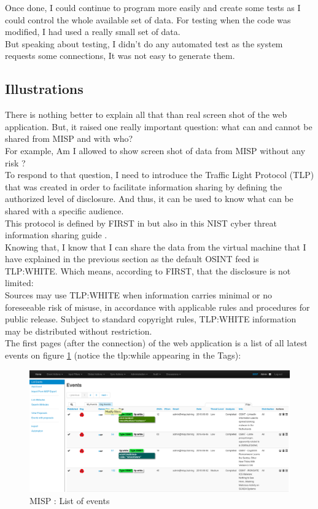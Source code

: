 \documentclass{eplmastersthesis}
\begin{document}
Once done, I could continue to program more easily and create some tests as I could control the whole available set of data. For testing when the code was modified, I had used a really small set of data. \\
But speaking about testing, I didn't do any automated test as the system requests some connections, It was not easy to generate them. 

\subsection{Illustrations}
There is nothing better to explain all that than real screen shot of the web application. But, it raised one really important question: what can and cannot be shared from MISP and with who?\\
For example, Am I allowed to show screen shot of data from MISP without any risk ?\\
To respond to that question, I need to introduce the Traffic Light Protocol (TLP) that was created in order to facilitate information sharing by defining the authorized level of disclosure. And thus, it can be used to know what can be shared with a specific audience.\\
This protocol is defined by FIRST in \cite{FirstTLP} but also in this NIST cyber threat information sharing guide \cite{johnson2016guide}.\\

Knowing that, I know that I can share the data from the virtual machine that I have explained in the previous section as the default OSINT feed is TLP:WHITE. Which means, according to FIRST, that the disclosure is not limited: \\
Sources may use TLP:WHITE when information carries minimal or no foreseeable risk of misuse, in accordance with applicable rules and procedures for public release. Subject to standard copyright rules, TLP:WHITE information may be distributed without restriction.\\

The first pages (after the connection) of the web application is a list of all latest events on figure \ref{webevents} (notice the tlp:while appearing in the Tags):

\begin{figure}[!h]
	\begin{center}
		\includegraphics[scale=0.32]{res/webEvents}
		\caption{MISP : List of events}
		\label{webevents}
	\end{center}
\end{figure}
\end{document}
